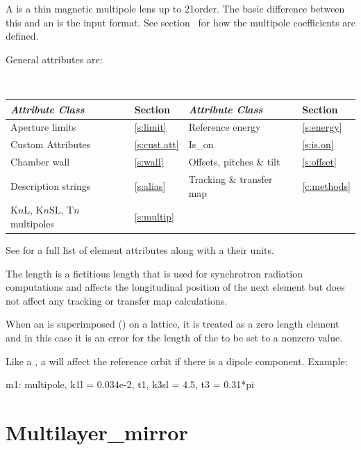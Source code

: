 {A  is a thin magnetic multipole lens up to 21\St order. The basic
difference between this and an  is the input
format. See section~ for how the multipole coefficients
are defined.

General  attributes are:
\begin{center}
\tt 
\begin{tabular}{llll} \toprule
  {\sl Attribute Class}          & Section           & {\sl Attribute Class}      & Section         \\ \midrule
  Aperture limits                & \ref{s:limit}     & Reference energy           & \ref{s:energy}  \\
  Custom Attributes              & \ref{s:cust.att}  & Is_on                      & \ref{s:is.on}   \\ 
  Chamber wall                   & \ref{s:wall}      & Offsets, pitches \& tilt   & \ref{s:offset}  \\
  Description strings            & \ref{s:alias}     & Tracking \& transfer map   & \ref{c:methods} \\ 
  K$n$L, K$n$SL, T$n$ multipoles & \ref{s:multip}    &                            &                 \\
  \bottomrule
\end{tabular}
\end{center}
\toffset
See  for a full list of element attributes along with a their units.

The length  is a fictitious length that is used for synchrotron
radiation computations and affects the longitudinal position of the
next element but does not affect any tracking or transfer map
calculations.

When an  is superimposed () on a lattice, it is
treated as a zero length element and in this case it is an error for the length
of the  to be set to a nonzero value.

Like a \mad {}, a \bmad {} will affect the
reference orbit if there is a dipole component. 
Example:
\begin{example}
  m1: multipole, k1l = 0.034e-2, t1, k3sl = 4.5, t3 = 0.31*pi
\end{example}

\newpage

\section{Multilayer_mirror}
\label{s:multilayer}

}

